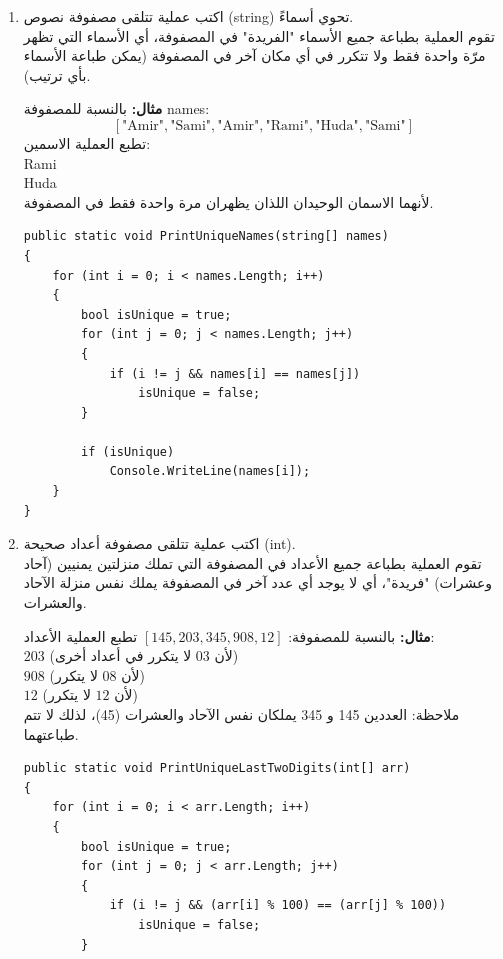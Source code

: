 \documentclass[14pt]{extarticle}
\begin{document}
\begin{enumerate}[itemsep=3em]
\item
اكتب عملية تتلقى مصفوفة نصوص (\textenglish{string}) تحوي أسماءً. \\
تقوم العملية بطباعة جميع الأسماء "الفريدة" في المصفوفة، أي الأسماء التي تظهر مرّة واحدة فقط ولا تتكرر في أي مكان آخر في المصفوفة (يمكن طباعة الأسماء بأي ترتيب).

\textbf{مثال:}
بالنسبة للمصفوفة \textenglish{names}:
$$ [\text{"Amir"}, \text{"Sami"}, \text{"Amir"}, \text{"Rami"}, \text{"Huda"}, \text{"Sami"}] $$
تطبع العملية الاسمين: \\
\textenglish{Rami} \\
\textenglish{Huda} \\
لأنهما الاسمان الوحيدان اللذان يظهران مرة واحدة فقط في المصفوفة.

\ifwithsols
\begin{boxSolution}
\begin{english}
\begin{verbatim}
public static void PrintUniqueNames(string[] names)
{
    for (int i = 0; i < names.Length; i++)
    {
        bool isUnique = true;
        for (int j = 0; j < names.Length; j++)
        {
            if (i != j && names[i] == names[j])
                isUnique = false;
        }

        if (isUnique)
            Console.WriteLine(names[i]);
    }
}
\end{verbatim}
\end{english}
\end{boxSolution}
\fi

\clearpage
\item
اكتب عملية تتلقى مصفوفة أعداد صحيحة (\textenglish{int}). \\
تقوم العملية بطباعة جميع الأعداد في المصفوفة التي تملك منزلتين يمنيين (آحاد وعشرات) "فريدة"، أي لا يوجد أي عدد آخر في المصفوفة يملك نفس منزلة الآحاد والعشرات.

\textbf{مثال:}
بالنسبة للمصفوفة:
$ [145, 203, 345, 908, 12] $
تطبع العملية الأعداد: \\
$203$ (لأن $03$ لا يتكرر في أعداد أخرى) \\
$908$ (لأن $08$ لا يتكرر) \\
$12$ (لأن $12$ لا يتكرر) \\
ملاحظة: العددين 145 و 345 يملكان نفس الآحاد والعشرات (45)، لذلك لا تتم طباعتهما.

\ifwithsols
\begin{boxSolution}
\begin{english}
\begin{verbatim}
public static void PrintUniqueLastTwoDigits(int[] arr)
{
    for (int i = 0; i < arr.Length; i++)
    {
        bool isUnique = true;
        for (int j = 0; j < arr.Length; j++)
        {
            if (i != j && (arr[i] % 100) == (arr[j] % 100))
                isUnique = false;
        }


\end{verbatim}
\end{english}
\end{boxSolution}
\end{enumerate}
\end{document}
